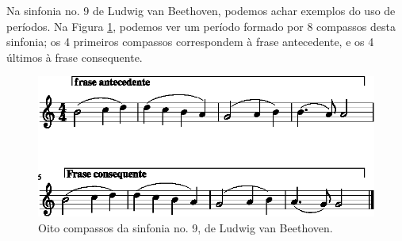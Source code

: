 \begin{example}
Na sinfonia no. 9 de Ludwig van Beethoven, podemos achar exemplos do uso de períodos. 
Na Figura \ref{fig:periodo-ex1}, podemos ver um período formado por 8 compassos desta sinfonia;
os 4 primeiros compassos correspondem à frase antecedente, 
e os 4 últimos à frase consequente.
\end{example}

\begin{figure}[!h]
  \centering
    \includegraphics[width=\textwidth]{chapters/cap-musica-composer/periodo-ex1-1.eps}
\caption{Oito compassos da sinfonia no. 9, de Ludwig van Beethoven.}
\label{fig:periodo-ex1}
\end{figure}


